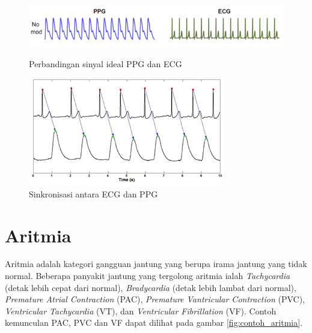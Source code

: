 \begin{figure}[H]
    \centering
    \includegraphics[scale=0.6]{images/ecg_vs_ppg.png}
    \caption{Perbandingan sinyal ideal PPG dan ECG}
    \label{fig:ecg_vs_ppg}
	\includegraphics[scale=0.8]{images/sinkronisasi.jpg}
    \caption{Sinkronisasi antara ECG dan PPG}
    \label{fig:ecg_vs_ppg2}
\end{figure}

\section{Aritmia}
Aritmia adalah kategori gangguan jantung yang berupa irama jantung yang tidak normal. Beberapa panyakit jantung yang tergolong aritmia ialah \textit{Tachycardia} (detak lebih cepat dari normal), \textit{Bradycardia} (detak lebih lambat dari normal), \textit{Premature Atrial Contraction} (PAC), \textit{Premature Vantricular Contraction} (PVC), \textit{Ventricular Tachycardia} (VT), dan \textit{Ventricular Fibrillation} (VF). Contoh kemunculan PAC, PVC dan VF dapat dilihat pada gambar \ref{fig:contoh_aritmia}.

